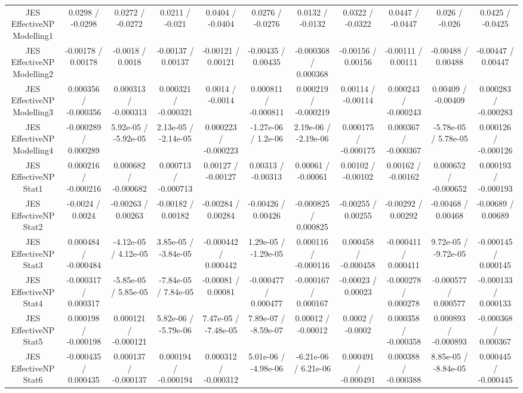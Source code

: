 \begin{table}[htbp]
\begin{center}
\begin{tabular}{|c|c|c|c|c|c|c|c|c|c|c|}
  JES EffectiveNP Modelling1 & 0.0298 / -0.0298 & 0.0272 / -0.0272 & 0.0211 / -0.021 & 0.0404 / -0.0404 & 0.0276 / -0.0276 & 0.0132 / -0.0132 & 0.0322 / -0.0322 & 0.0447 / -0.0447 & 0.026 / -0.026 & 0.0425 / -0.0425 \\ 
  JES EffectiveNP Modelling2 & -0.00178 / 0.00178 & -0.0018 / 0.0018 & -0.00137 / 0.00137 & -0.00121 / 0.00121 & -0.00435 / 0.00435 & -0.000368 / 0.000368 & -0.00156 / 0.00156 & -0.00111 / 0.00111 & -0.00488 / 0.00488 & -0.00447 / 0.00447 \\ 
  JES EffectiveNP Modelling3 & 0.000356 / -0.000356 & 0.000313 / -0.000313 & 0.000321 / -0.000321 & 0.0014 / -0.0014 & 0.000811 / -0.000811 & 0.000219 / -0.000219 & 0.00114 / -0.00114 & 0.000243 / -0.000243 & 0.00409 / -0.00409 & 0.000283 / -0.000283 \\ 
  JES EffectiveNP Modelling4 & -0.000289 / 0.000289 & 5.92e-05 / -5.92e-05 & 2.13e-05 / -2.14e-05 & 0.000223 / -0.000223 & -1.27e-06 / 1.2e-06 & 2.19e-06 / -2.19e-06 & 0.000175 / -0.000175 & 0.000367 / -0.000367 & -5.78e-05 / 5.78e-05 & 0.000126 / -0.000126 \\ 
  JES EffectiveNP Stat1 & 0.000216 / -0.000216 & 0.000682 / -0.000682 & 0.000713 / -0.000713 & 0.00127 / -0.00127 & 0.00313 / -0.00313 & 0.00061 / -0.00061 & 0.00102 / -0.00102 & 0.00162 / -0.00162 & 0.000652 / -0.000652 & 0.000193 / -0.000193 \\ 
  JES EffectiveNP Stat2 & -0.0024 / 0.0024 & -0.00263 / 0.00263 & -0.00182 / 0.00182 & -0.00284 / 0.00284 & -0.00426 / 0.00426 & -0.000825 / 0.000825 & -0.00255 / 0.00255 & -0.00292 / 0.00292 & -0.00468 / 0.00468 & -0.00689 / 0.00689 \\ 
  JES EffectiveNP Stat3 & 0.000484 / -0.000484 & -4.12e-05 / 4.12e-05 & 3.85e-05 / -3.84e-05 & -0.000442 / 0.000442 & 1.29e-05 / -1.29e-05 & 0.000116 / -0.000116 & 0.000458 / -0.000458 & -0.000411 / 0.000411 & 9.72e-05 / -9.72e-05 & -0.000145 / 0.000145 \\ 
  JES EffectiveNP Stat4 & -0.000317 / 0.000317 & -5.85e-05 / 5.85e-05 & -7.84e-05 / 7.84e-05 & -0.00081 / 0.00081 & -0.000477 / 0.000477 & -0.000167 / 0.000167 & -0.00023 / 0.00023 & -0.000278 / 0.000278 & -0.000577 / 0.000577 & -0.000133 / 0.000133 \\ 
  JES EffectiveNP Stat5 & 0.000198 / -0.000198 & 0.000121 / -0.000121 & 5.82e-06 / -5.79e-06 & 7.47e-05 / -7.48e-05 & 7.89e-07 / -8.59e-07 & 0.00012 / -0.00012 & 0.0002 / -0.0002 & 0.000358 / -0.000358 & 0.000893 / -0.000893 & -0.000368 / 0.000367 \\ 
  JES EffectiveNP Stat6 & -0.000435 / 0.000435 & 0.000137 / -0.000137 & 0.000194 / -0.000194 & 0.000312 / -0.000312 & 5.01e-06 / -4.98e-06 & -6.21e-06 / 6.21e-06 & 0.000491 / -0.000491 & 0.000388 / -0.000388 & 8.85e-05 / -8.84e-05 & 0.000445 / -0.000445 \\ 

\end{tabular}
\end{center}
\end{table}
